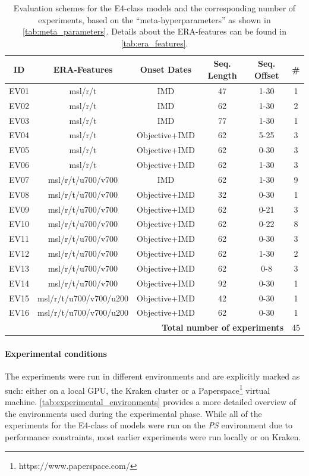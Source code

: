 \begin{table}[h!]
  \centering
  \begin{tabular}{cccccc}
    \toprule
    \textbf{ID} & \textbf{ERA-Features} & \textbf{Onset Dates} & \textbf{Seq. Length} & \textbf{Seq. Offset}  & \textbf{\#} \\
    \midrule
    EV01 & msl/r/t & IMD & 47 & 1-30 & 1 \\
    EV02 & msl/r/t & IMD & 62 & 1-30 & 2 \\
    EV03 & msl/r/t & IMD & 77 & 1-30 & 1 \\
    EV04 & msl/r/t & Objective+IMD & 62 & 5-25 & 3 \\
    EV05 & msl/r/t & Objective+IMD & 62 & 0-30 & 3 \\
    EV06 & msl/r/t & Objective+IMD & 62 & 1-30 & 3 \\
    EV07 & msl/r/t/u700/v700 & IMD & 62 & 1-30 & 9 \\
    EV08 & msl/r/t/u700/v700 & Objective+IMD & 32 & 0-30 & 1 \\
    EV09 & msl/r/t/u700/v700 & Objective+IMD & 62 & 0-21 & 3 \\
    EV10 & msl/r/t/u700/v700 & Objective+IMD & 62 & 0-22 & 8 \\
    EV11 & msl/r/t/u700/v700 & Objective+IMD & 62 & 0-30 & 3 \\
    EV12 & msl/r/t/u700/v700 & Objective+IMD & 62 & 1-30 & 2 \\
    EV13 & msl/r/t/u700/v700 & Objective+IMD & 62 & 0-8 & 3 \\
    EV14 & msl/r/t/u700/v700 & Objective+IMD & 92 & 0-30 & 1 \\
    EV15 & msl/r/t/u700/v700/u200 & Objective+IMD & 42 & 0-30 & 1 \\
    EV16 & msl/r/t/u700/v700/u200 & Objective+IMD & 62 & 0-30 & 1 \\
    \midrule
    \multicolumn{5}{r}{\textbf{Total number of experiments}} & 45 \\
    \bottomrule
  \end{tabular}
  \caption{Evaluation schemes for the E4-class models and the corresponding number of experiments, based on the ``meta-hyperparameters'' as shown in \cref{tab:meta_parameters}. Details about the ERA-features can be found in \cref{tab:era_features}.}
  \label{tab:evaluation_schemes}
\end{table}

\paragraph{Experimental conditions}
The experiments were run in different environments and are explicitly marked as such: either on a local GPU, the Kraken cluster or a Paperspace\footnote{https://www.paperspace.com/} virtual machine. \cref{tab:experimental_environments} provides a more detailed overview of the environments used during the experimental phase. While all of the experiments for the E4-class of models were run on the \textit{PS} environment due to performance constraints, most earlier experiments were run locally or on Kraken.

